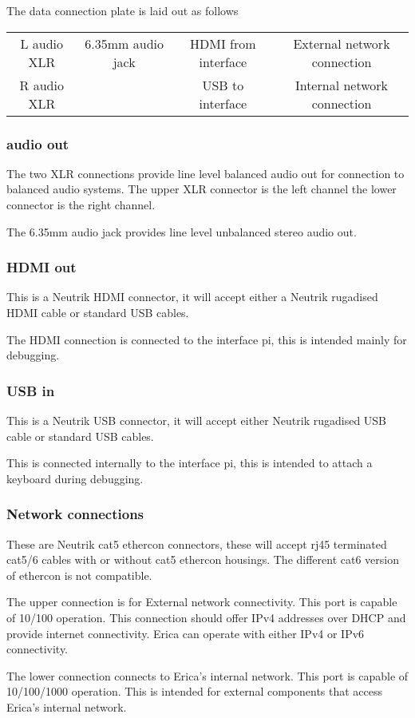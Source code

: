 The data connection plate is laid out as follows

\begin{tabular}[h]{cccc}

L audio XLR & 6.35mm audio jack & HDMI from interface & External network connection \\
R audio XLR & & USB to interface & Internal network connection \\

\end{tabular}

\subsubsection{audio out}

The two XLR connections provide line level balanced audio out for connection to balanced audio systems. The upper XLR connector is the left channel the lower connector is the right channel.

The 6.35mm audio jack provides line level unbalanced stereo audio out.

\subsubsection{HDMI out}

This is a Neutrik HDMI connector, it will accept either a Neutrik rugadised HDMI cable or standard USB cables.

The HDMI connection is connected to the interface pi, this is intended mainly for debugging.

\subsubsection{USB in}

This is a Neutrik USB connector, it will accept either Neutrik rugadised USB cable or standard USB cables.

This is connected internally to the interface pi, this is intended to attach a keyboard during debugging.

\subsubsection{Network connections}

These are Neutrik cat5 ethercon connectors, these will accept rj45 terminated cat5/6 cables with or without cat5 ethercon housings. The different cat6 version of ethercon is not compatible.

The upper connection is for External network connectivity. This port is capable of 10/100 operation. This connection should offer IPv4 addresses over DHCP and provide internet connectivity. Erica can operate with either IPv4 or IPv6 connectivity.

The lower connection connects to Erica's internal network. This port is capable of 10/100/1000 operation. This is intended for external components that access Erica's internal network.



